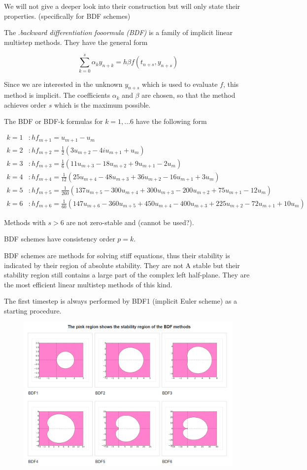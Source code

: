 	We will not give a deeper look into their construction but will only state their properties. (specifically for BDF schemes)
	
	The .\emph{backward differentiation fooormula (BDF)} is a family of implicit linear multistep methods. They have the general form
	
	\begin{equation}
		\sum_{k=0}^{s} \alpha_k y_{n+k} = h \beta f(t_{n+s}, y_{n+s})
	\end{equation}

	Since we are interested in the unknown $y_{n+s}$ which is used to evaluate $f$, this method is implicit. The coefficients $\alpha_k$ and $\beta$ are chosen, so that the method achieves order $s$ which is the maximum possible.
	
	The BDF or BDF-k formulas for $k=1,...6$ have the following form
	
	\begin{align*}
		k = 1 &: h f_{m+1} = u_{m+1} - u_m \\
		k = 2 &: h f_{m+2} = \frac{1}{2} (3 u_{m+2} - 4 iu_{m+1} + u_m) \\
		k = 3 &: h f_{m+3} = \frac{1}{6} (11 u_{m+3} - 18 u_{m+2} + 9 u_{m+1} - 2 u_m) \\
		k = 4 &: h f_{m+4} = \frac{1}{12} (25 u_{m+4} - 48 u_{m+3} + 36 u_{m+2} - 16 u_{m+1} + 3 u_m) \\
		k = 5 &: h f_{m+5} = \frac{1}{260} (137 u_{m+5} - 300 u_{m+4} + 300 u_{m+3} - 200 u_{m+2} +75 u_{m+1} -12 u_m) \\
		k = 6 &: h f_{m+6} = \frac{1}{60} (147 u_{m+6} - 360 u_{m+5} + 450 u_{m+4} - 400 u_{m+3} + 225 u_{m+2} - 72 u_{m+1} + 10 u_m)
	\end{align*}
	
	Methods with $s > 6$ are not zero-stable and (cannot be used?).
	
	BDF schemes have consistency order $p = k$.
	
	BDF schemes are methods for solving stiff equations, thus their stability is indicated by their region of absolute stability. They are not A stable but their stability region still contains a large part of the complex left half-plane. They are the most efficient linear multistep methods of this kind.
	
	The first timestep is always performed by BDF1 (implicit Euler scheme) as a starting procedure.
	
	\begin{figure}[H]
		\centering
		\includegraphics[width=0.7\linewidth]{screenshot020}
		\caption{}
		\label{fig:screenshot020}
	\end{figure}
	
